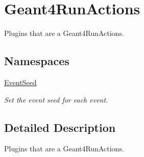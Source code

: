 \hypertarget{group___geant4_run_actions}{}\section{Geant4\+Run\+Actions}
\label{group___geant4_run_actions}


Plugins that are a Geant4\+Run\+Actions.  


\subsection*{Namespaces}
\begin{DoxyCompactItemize}
\item 
 \hyperlink{namespace_event_seed}{Event\+Seed}
\begin{DoxyCompactList}\small\item\em Set the event seed for each event. \end{DoxyCompactList}\end{DoxyCompactItemize}


\subsection{Detailed Description}
Plugins that are a Geant4\+Run\+Actions. 

